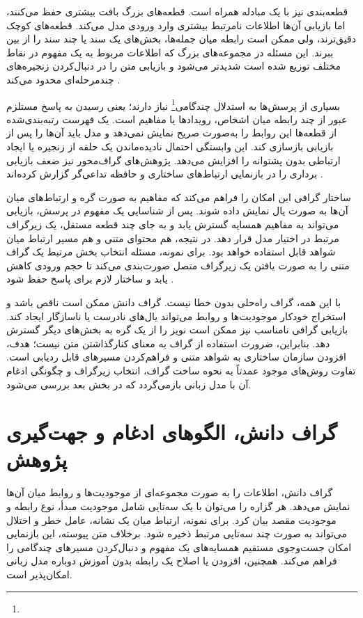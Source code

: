 قطعه‌بندی نیز با یک مبادله همراه است. قطعه‌های بزرگ بافت بیشتری حفظ می‌کنند، اما بازیابی آن‌ها اطلاعات نامرتبط بیشتری وارد ورودی مدل می‌کند. قطعه‌های کوچک دقیق‌ترند، ولی ممکن است رابطه میان جمله‌ها، بخش‌های یک سند یا چند سند را از بین ببرند. این مسئله در مجموعه‌های بزرگ که اطلاعات مربوط به یک مفهوم در نقاط مختلف توزیع شده است شدیدتر می‌شود و بازیابی متن را در دنبال‌کردن زنجیره‌های چندمرحله‌ای محدود می‌کند \cite{ma2025tog2,zhuang2026linearrag}.

بسیاری از پرسش‌ها به استدلال چندگامی\footnote{} نیاز دارند؛ یعنی رسیدن به پاسخ مستلزم عبور از چند رابطه میان اشخاص، رویدادها یا مفاهیم است. یک فهرست رتبه‌بندی‌شده از قطعه‌ها این روابط را به‌صورت صریح نمایش نمی‌دهد و مدل باید آن‌ها را پس از بازیابی بازسازی کند. این وابستگی احتمال نادیده‌ماندن یک حلقه از زنجیره یا ایجاد ارتباطی بدون پشتوانه را افزایش می‌دهد. پژوهش‌های گراف‌محور نیز ضعف بازیابی برداری را در بازنمایی ارتباط‌های ساختاری و حافظه تداعی‌گر گزارش کرده‌اند \cite{gutierrez2025hipporag2}.

ساختار گرافی این امکان را فراهم می‌کند که مفاهیم به صورت گره و ارتباط‌های میان آن‌ها به صورت یال نمایش داده شوند. پس از شناسایی یک مفهوم در پرسش، بازیابی می‌تواند به مفاهیم همسایه گسترش یابد و به جای چند قطعه مستقل، یک زیرگراف مرتبط در اختیار مدل قرار دهد. در نتیجه، هم محتوای متنی و هم مسیر ارتباط میان شواهد قابل استفاده خواهد بود. برای نمونه،  مسئله انتخاب بخش مرتبط یک گراف متنی را به صورت یافتن یک زیرگراف متصل صورت‌بندی می‌کند تا حجم ورودی کاهش یابد و ساختار لازم برای پاسخ حفظ شود \cite{he2024gretriever}.

با این همه، گراف راه‌حلی بدون خطا نیست. گراف دانش ممکن است ناقص باشد و استخراج خودکار موجودیت‌ها و روابط می‌تواند یال‌های نادرست یا ناسازگار ایجاد کند. بازیابی گرافی نامناسب نیز ممکن است نویز را از یک گره به بخش‌های دیگر گسترش دهد. بنابراین، ضرورت استفاده از گراف به معنای کنارگذاشتن متن نیست؛ هدف، افزودن سازمان ساختاری به شواهد متنی و فراهم‌کردن مسیرهای قابل ردیابی است. تفاوت روش‌های موجود عمدتاً به نحوه ساخت گراف، انتخاب زیرگراف و چگونگی ادغام آن با مدل زبانی بازمی‌گردد که در بخش بعد بررسی می‌شود.

\section{گراف دانش، الگوهای ادغام و جهت‌گیری پژوهش}

گراف دانش، اطلاعات را به صورت مجموعه‌ای از موجودیت‌ها و روابط میان آن‌ها نمایش می‌دهد. هر گزاره را می‌توان با یک سه‌تایی شامل موجودیت مبدأ، نوع رابطه و موجودیت مقصد بیان کرد. برای نمونه، ارتباط میان یک نشانه، عامل خطر و اختلال می‌تواند به صورت چند سه‌تایی مرتبط ذخیره شود. برخلاف متن پیوسته، این بازنمایی امکان جست‌وجوی مستقیم همسایه‌های یک مفهوم و دنبال‌کردن مسیرهای چندگامی را فراهم می‌کند. همچنین، افزودن یا اصلاح یک رابطه بدون آموزش دوباره مدل زبانی امکان‌پذیر است.

